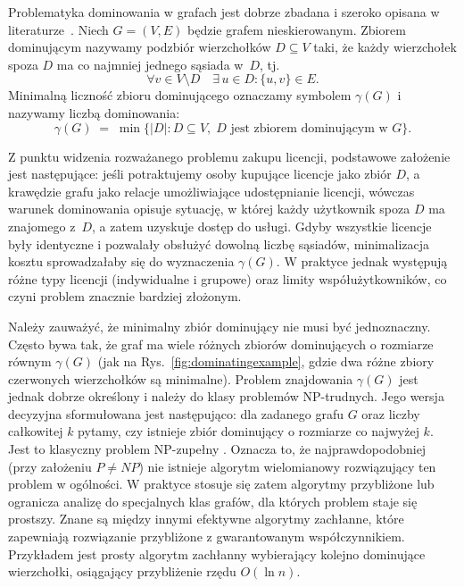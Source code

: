Problematyka dominowania w grafach jest dobrze zbadana i szeroko opisana w literaturze~\cite{haynes1998domination}.
Niech \(G = (V,E)\) będzie grafem nieskierowanym.
Zbiorem dominującym nazywamy podzbiór wierzchołków \(D \subseteq V\) taki, że każdy
wierzchołek spoza \(D\) ma co najmniej jednego sąsiada w~\(D\), tj. \[\forall v \in V \setminus D \quad \exists\,u \in D : \{u,v\} \in E.\]
Minimalną liczność zbioru dominującego oznaczamy symbolem \(\gamma(G)\) i nazywamy liczbą dominowania:
\[
\gamma(G) \;=\; \min\bigl\{|D| : D\subseteq V,\; D \text{ jest zbiorem dominującym w } G\bigr\}.
\]

Z punktu widzenia rozważanego problemu zakupu licencji, podstawowe założenie jest następujące:
jeśli potraktujemy osoby kupujące licencje jako zbiór \(D\), a krawędzie grafu jako relacje
umożliwiające udostępnianie licencji, wówczas warunek dominowania opisuje sytuację, w której
każdy użytkownik spoza \(D\) ma znajomego z~\(D\), a zatem uzyskuje dostęp do usługi.
Gdyby wszystkie licencje były identyczne i pozwalały obsłużyć dowolną liczbę sąsiadów,
minimalizacja kosztu sprowadzałaby się do wyznaczenia \(\gamma(G)\).
W praktyce jednak występują różne typy licencji (indywidualne i grupowe) oraz limity
współużytkowników, co czyni problem znacznie bardziej złożonym.


Należy zauważyć, że minimalny zbiór dominujący nie musi być jednoznaczny. Często bywa tak, że graf ma wiele różnych zbiorów dominujących o rozmiarze równym $\gamma(G)$ (jak na Rys.~\ref{fig:dominatingexample}, gdzie dwa różne zbiory czerwonych wierzchołków są minimalne). Problem znajdowania $\gamma(G)$ jest jednak dobrze określony i należy do klasy problemów NP-trudnych. Jego wersja decyzyjna sformułowana jest następująco: dla zadanego grafu $G$ oraz liczby całkowitej $k$ pytamy, czy istnieje zbiór dominujący o rozmiarze co najwyżej $k$. Jest to klasyczny problem NP-zupełny \cite{wikiDominatingSet, POUREIDI2023106363, PANDA2023337}. Oznacza to, że najprawdopodobniej (przy założeniu $P \neq NP$) nie istnieje algorytm wielomianowy rozwiązujący ten problem w ogólności. W praktyce stosuje się zatem algorytmy przybliżone lub ogranicza analizę do specjalnych klas grafów, dla których problem staje się prostszy. Znane są między innymi efektywne algorytmy zachłanne, które zapewniają rozwiązanie przybliżone z gwarantowanym współczynnikiem. Przykładem jest prosty algorytm zachłanny wybierający kolejno dominujące wierzchołki, osiągający przybliżenie rzędu $O(\ln n)$.


